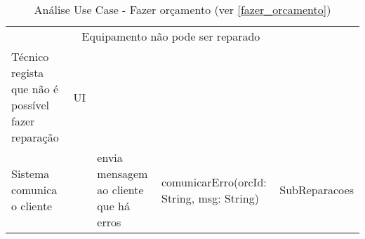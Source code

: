 \documentclass[../relatorio.tex]{subfiles}
\begin{document}
\begin{landscape}
\begin{table}[!h]
\begin{tabular}{|p{5cm}|p{1cm}|p{4cm}|p{6cm}|p{3cm}|}
                     & 
            \multicolumn{3}{c}{Equipamento não pode ser reparado}
            \\
            \rowcolor{yellow}
            \hline
            Técnico regista que não é possível fazer reparação
                     & 
            UI
                     & 
                     & 
                     & 
            \\
            \hline
            Sistema comunica o cliente
                     & 
                     & 
            envia mensagem ao cliente que há erros
                     & 
            comunicarErro(orcId: String, msg: String)
                     & 
            SubReparacoes
            \\
            \hline
        \end{tabular}
        \caption{Análise Use Case - Fazer orçamento (ver \ref{fazer_orcamento})}
    \end{table}
\end{landscape}
\end{document}
